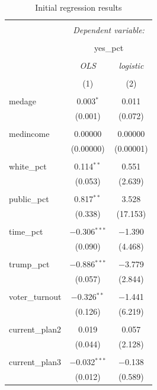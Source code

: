 \documentclass[
]{article}
\begin{document}
\begin{table}[!htbp] \centering 
  \caption{Initial regression results} 
  \label{initialResults} 
\begin{tabular}{@{\extracolsep{5pt}}lcc} 
\\[-1.8ex]\hline 
\hline \\[-1.8ex] 
 & \multicolumn{2}{c}{\textit{Dependent variable:}} \\ 
\cline{2-3} 
\\[-1.8ex] & \multicolumn{2}{c}{yes\_pct} \\ 
\\[-1.8ex] & \textit{OLS} & \textit{logistic} \\ 
\\[-1.8ex] & (1) & (2)\\ 
\hline \\[-1.8ex] 
 medage & 0.003$^{*}$ & 0.011 \\ 
  & (0.001) & (0.072) \\ 
  & & \\ 
 medincome & 0.00000 & 0.00000 \\ 
  & (0.00000) & (0.00001) \\ 
  & & \\ 
 white\_pct & 0.114$^{**}$ & 0.551 \\ 
  & (0.053) & (2.639) \\ 
  & & \\ 
 public\_pct & 0.817$^{**}$ & 3.528 \\ 
  & (0.338) & (17.153) \\ 
  & & \\ 
 time\_pct & $-$0.306$^{***}$ & $-$1.390 \\ 
  & (0.090) & (4.468) \\ 
  & & \\ 
 trump\_pct & $-$0.886$^{***}$ & $-$3.779 \\ 
  & (0.057) & (2.844) \\ 
  & & \\ 
 voter\_turnout & $-$0.326$^{**}$ & $-$1.441 \\ 
  & (0.126) & (6.219) \\ 
  & & \\ 
 current\_plan2 & 0.019 & 0.057 \\ 
  & (0.044) & (2.128) \\ 
  & & \\ 
 current\_plan3 & $-$0.032$^{***}$ & $-$0.138 \\ 
  & (0.012) & (0.589) \\ 

\end{tabular}
\end{table}
\end{document}
